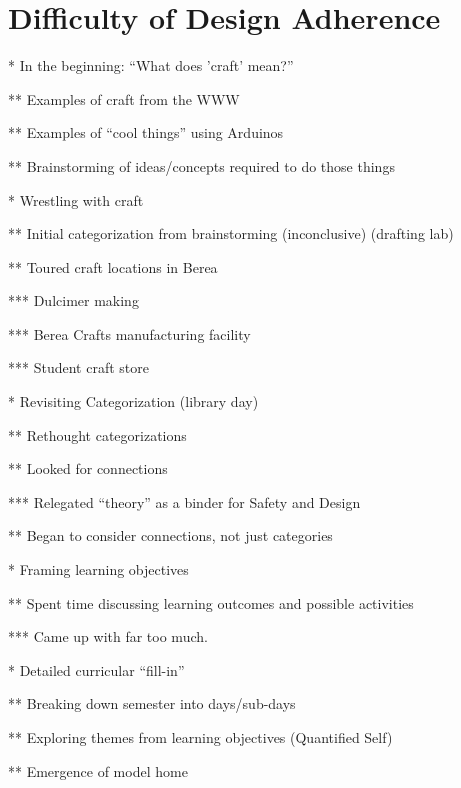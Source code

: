 \section{Difficulty of Design Adherence}

\begin{comment}
  This is all too chronological. Actual writing will need to condense a great deal of this so that we focus on the result---the fact that the compelling context is what made it easy to adhere to our design goals. When we didn't have clear design goals, it was easy to slip into old ways of thinking... but a clear context for the design to be expressed made it possible to put craft first as opposed to focusing on theory.
\end{comment}

* In the beginning: ``What does 'craft' mean?''

** Examples of craft from the WWW

** Examples of ``cool things'' using Arduinos

** Brainstorming of ideas/concepts required to do those things

* Wrestling with craft

** Initial categorization from brainstorming (inconclusive) (drafting lab)

** Toured craft locations in Berea

*** Dulcimer making

*** Berea Crafts manufacturing facility

*** Student craft store

* Revisiting Categorization (library day)

** Rethought categorizations

** Looked for connections

*** Relegated ``theory'' as a binder for Safety and Design

** Began to consider connections, not just categories

* Framing learning objectives

** Spent time discussing learning outcomes and possible activities

*** Came up with far too much.

* Detailed curricular ``fill-in''

** Breaking down semester into days/sub-days

** Exploring themes from learning objectives (Quantified Self)

** Emergence of model home

